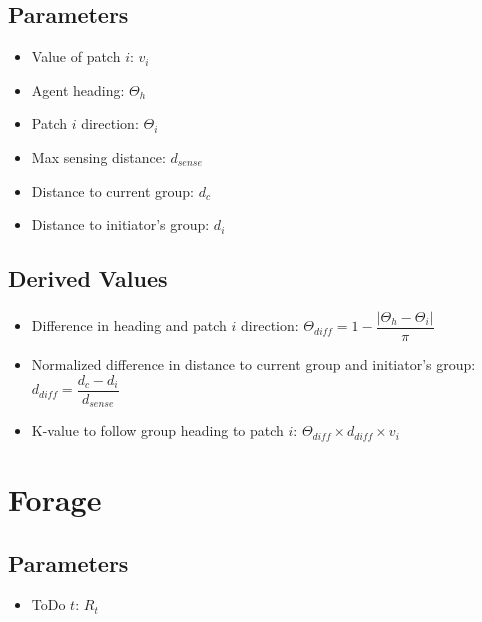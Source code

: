 \documentclass[letterpaper,12pt]{article}
\begin{document}
\subsection{Parameters}

\begin{itemize}
  \item Value of patch $i$: $v_{i}$
  \item Agent heading: $\Theta_{h}$
  \item Patch $i$ direction: $\Theta_{i}$
  \item Max sensing distance: $d_{sense}$
  \item Distance to current group: $d_{c}$
  \item Distance to initiator's group: $d_{i}$
\end{itemize}

\subsection{Derived Values}

\begin{itemize}
  \item Difference in heading and patch $i$ direction: $\Theta_{diff} = 1 - \dfrac{\lvert \Theta_{h} - \Theta_{i} \rvert}{\pi}$
  \item Normalized difference in distance to current group and initiator's group:\\ $d_{diff} = \dfrac{d_{c} - d_{i}}{d_{sense}}$
  \item K-value to follow group heading to patch $i$: $\Theta_{diff} \times d_{diff} \times v_{i}$
\end{itemize}


\section{Forage}

\subsection{Parameters}

\begin{itemize}
 \item ToDo $t$: $R_t$
\end{itemize}
\end{document}
